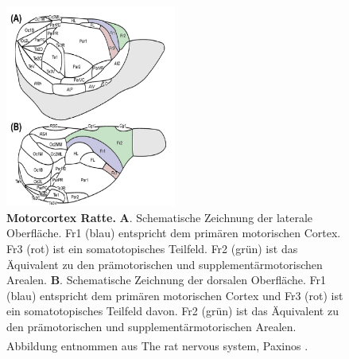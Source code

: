 \documentclass[12pt,a4paper,pdftex]{article}
\begin{document}
\begin{figure}[H]
    \centering
    \includegraphics[width=0.5\textwidth]{pictures/Bilder_Laura/rat_motorcortex_1.png}
    \caption[Motorcortex Ratte]{\textbf{Motorcortex Ratte.} \textbf{A}. Schematische Zeichnung der laterale Oberfläche. Fr1 (blau) entspricht dem primären motorischen Cortex. Fr3 (rot) ist ein somatotopisches Teilfeld. Fr2 (grün) ist das Äquivalent zu den prämotorischen und supplementärmotorischen Arealen. \textbf{B}. Schematische Zeichnung der dorsalen Oberfläche. Fr1 (blau) entspricht dem primären motorischen Cortex und Fr3 (rot) ist ein somatotopisches Teilfeld davon. Fr2 (grün) ist das Äquivalent zu den prämotorischen und supplementärmotorischen Arealen. Abbildung entnommen aus The rat nervous system, Paxinos \textsuperscript{\cite[22]{paxinos2014rat}}.}
    \label{fig:motorcortex_ratte}
\end{figure}
\end{document}
